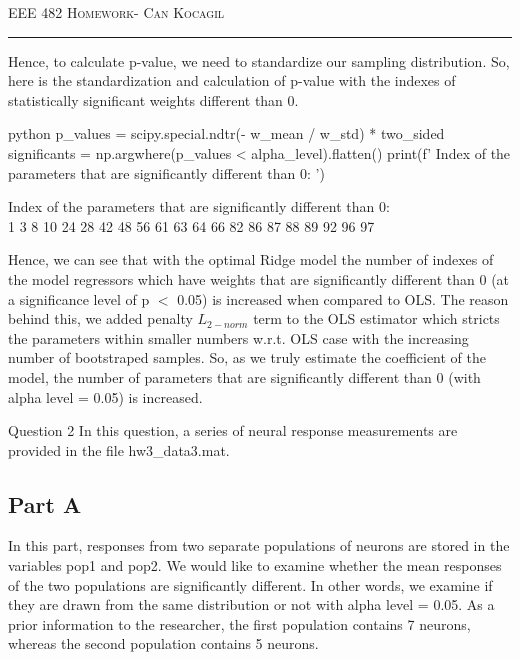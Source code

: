 \documentclass[12pt]{amsart}
\makeatletter
\def\section{\@startsection{section}{1}%
  \z@{.7\linespacing\@plus\linespacing}{.5\linespacing}%
  {\normalfont\scshape}}%
\makeatother
\begin{document}
\newpage
{\scshape EEE 482} \hfill {\scshape \large  Homework-\relax} \hfill {\scshape Can Kocagil}
\smallskip
\hrule
\vspace{2mm}


Hence, to calculate p-value, we need to standardize our sampling distribution. So, here is the standardization and calculation of p-value with the indexes of statistically significant weights different than 0.

\begin{mintedbox}{python}
p_values = scipy.special.ndtr(- w_mean / w_std) * two_sided
significants = np.argwhere(p_values < alpha_level).flatten()
print(f' Index of the parameters that are significantly different than 0: ')
      
\end{mintedbox}

Index of the parameters that are significantly different than 0: \\
 1  3  8 10 24 28 42 48 56 61 63 64 66 82 86 87 88 89 92 96 97

\bigskip

Hence, we can see that with the optimal Ridge model the number of indexes of the model regressors which have weights that are significantly different than 0 (at a significance level of p $<$ 0.05) is increased when compared to OLS. The reason behind this, we added penalty $L_{2-norm}$ term to the OLS estimator which stricts the parameters within smaller numbers w.r.t. OLS case with the increasing number of bootstraped samples. So, as we truly estimate the coefficient of the model, the number of parameters that are significantly different than 0 (with alpha level = 0.05) is increased.

\section{Question 2}
In this question, a series of neural response measurements are provided in the file hw3\_data3.mat.

\subsection{Part A}
In this part, responses from two separate populations of neurons are stored in the variables pop1 and pop2. We would like to examine whether the mean responses of the two populations are significantly different. In other words, we examine if they are drawn from the same distribution or not with alpha level = 0.05. As a prior information to the researcher, the first population contains 7 neurons, whereas the second population contains 5 neurons. 
\end{document}
